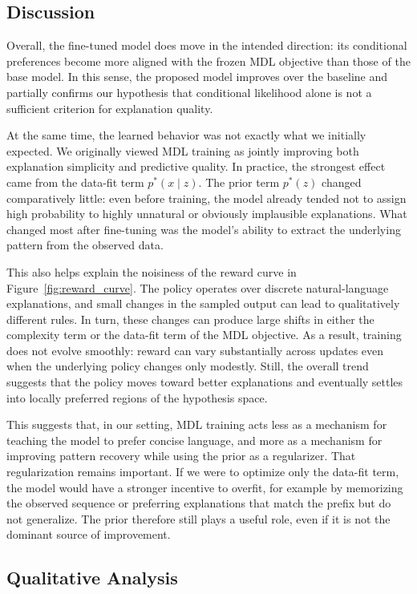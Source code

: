 \documentclass{article}
\theoremstyle{plain}
\theoremstyle{definition}
\theoremstyle{remark}
\begin{document}
\subsection{Discussion}

Overall, the fine-tuned model does move in the intended direction: its conditional preferences become more aligned with the frozen MDL objective than those of the base model. In this sense, the proposed model improves over the baseline and partially confirms our hypothesis that conditional likelihood alone is not a sufficient criterion for explanation quality.

At the same time, the learned behavior was not exactly what we initially expected. We originally viewed MDL training as jointly improving both explanation simplicity and predictive quality. In practice, the strongest effect came from the data-fit term $p^*(x \mid z)$. The prior term $p^*(z)$ changed comparatively little: even before training, the model already tended not to assign high probability to highly unnatural or obviously implausible explanations. What changed most after fine-tuning was the model's ability to extract the underlying pattern from the observed data.

This also helps explain the noisiness of the reward curve in Figure~\ref{fig:reward_curve}. The policy operates over discrete natural-language explanations, and small changes in the sampled output can lead to qualitatively different rules. In turn, these changes can produce large shifts in either the complexity term or the data-fit term of the MDL objective. As a result, training does not evolve smoothly: reward can vary substantially across updates even when the underlying policy changes only modestly. Still, the overall trend suggests that the policy moves toward better explanations and eventually settles into locally preferred regions of the hypothesis space.

This suggests that, in our setting, MDL training acts less as a mechanism for teaching the model to prefer concise language, and more as a mechanism for improving pattern recovery while using the prior as a regularizer. That regularization remains important. If we were to optimize only the data-fit term, the model would have a stronger incentive to overfit, for example by memorizing the observed sequence or preferring explanations that match the prefix but do not generalize. The prior therefore still plays a useful role, even if it is not the dominant source of improvement.

\subsection{Qualitative Analysis}
\end{document}
